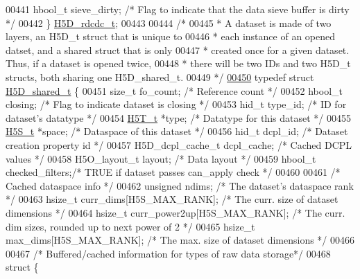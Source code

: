\begin{DoxyCode}
00441     hbool\_t sieve\_dirty;        \textcolor{comment}{/* Flag to indicate that the data sieve buffer is dirty */}
00442 \} \hyperlink{struct_h5_d__rdcdc__t}{H5D\_rdcdc\_t};
00443 
00444 \textcolor{comment}{/*}
00445 \textcolor{comment}{ * A dataset is made of two layers, an H5D\_t struct that is unique to}
00446 \textcolor{comment}{ * each instance of an opened datset, and a shared struct that is only}
00447 \textcolor{comment}{ * created once for a given dataset.  Thus, if a dataset is opened twice,}
00448 \textcolor{comment}{ * there will be two IDs and two H5D\_t structs, both sharing one H5D\_shared\_t.}
00449 \textcolor{comment}{ */}
\hyperlink{struct_h5_d__shared__t}{00450} \textcolor{keyword}{typedef} \textcolor{keyword}{struct }\hyperlink{struct_h5_d__shared__t}{H5D\_shared\_t} \{
00451     \textcolor{keywordtype}{size\_t}              fo\_count;       \textcolor{comment}{/* Reference count */}
00452     hbool\_t             closing;        \textcolor{comment}{/* Flag to indicate dataset is closing */}
00453     hid\_t               type\_id;        \textcolor{comment}{/* ID for dataset's datatype    */}
00454     \hyperlink{struct_h5_t__t}{H5T\_t}              *type;           \textcolor{comment}{/* Datatype for this dataset     */}
00455     \hyperlink{struct_h5_s__t}{H5S\_t}              *space;          \textcolor{comment}{/* Dataspace of this dataset    */}
00456     hid\_t               dcpl\_id;        \textcolor{comment}{/* Dataset creation property id */}
00457     H5D\_dcpl\_cache\_t    dcpl\_cache;     \textcolor{comment}{/* Cached DCPL values */}
00458     H5O\_layout\_t        layout;         \textcolor{comment}{/* Data layout                  */}
00459     hbool\_t             checked\_filters;\textcolor{comment}{/* TRUE if dataset passes can\_apply check */}
00460 
00461     \textcolor{comment}{/* Cached dataspace info */}
00462     \textcolor{keywordtype}{unsigned}            ndims;          \textcolor{comment}{/* The dataset's dataspace rank */}
00463     hsize\_t             curr\_dims[H5S\_MAX\_RANK];    \textcolor{comment}{/* The curr. size of dataset dimensions */}
00464     hsize\_t             curr\_power2up[H5S\_MAX\_RANK];    \textcolor{comment}{/* The curr. dim sizes, rounded up to next power of
       2 */}
00465     hsize\_t             max\_dims[H5S\_MAX\_RANK];     \textcolor{comment}{/* The max. size of dataset dimensions */} 
00466 
00467     \textcolor{comment}{/* Buffered/cached information for types of raw data storage*/}
00468     \textcolor{keyword}{struct }\{

\end{DoxyCode}
